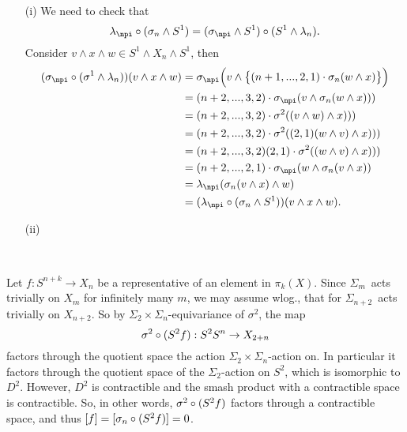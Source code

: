 \begin{exercise}[2]\ 
\begin{enumerate}
\item[(i)]
We need to check that 
\[ \lambda_\npi \circ (\sigma_n \wedge S^1) = (\sigma_\npi \wedge S^1) \circ
(S^1 \wedge \lambda_n). \]
Consider $v \wedge x \wedge w \in S^1 \wedge X_n \wedge S^1$, then
\begin{align*}
(\sigma_\npi \circ (\sigma^1 \wedge \lambda_n))(v \wedge x \wedge w) 
&= \sigma_\npi\Big(v \wedge \big\{ (n+1,...,2,1)\cdot\sigma_n(w \wedge x)\big\}\Big) \\
&= (n+2,...,3,2)\cdot\sigma_\npi(v \wedge \sigma_n(w\wedge x))) \\
&= (n+2,...,3,2) \cdot \sigma^2( (v \wedge w) \wedge x))) \\
&= (n+2,...,3,2) \cdot \sigma^2( (2,1) (w \wedge v) \wedge x))) \\
&= (n+2,...,3,2)(2,1) \cdot \sigma^2( (w \wedge v) \wedge x))) \\
&= (n+2,...,2,1) \cdot \sigma_\npi( w \wedge \sigma_n(v \wedge x)) \\
&= \lambda_\npi( \sigma_n(v \wedge x) \wedge w) \\
&= (\lambda_\npi \circ (\sigma_n \wedge S^1))(v \wedge x \wedge w).
\end{align*}

\item[(ii)]
\end{enumerate}
\end{exercise}

\begin{exercise}[3]\ 

Let $f : S^{n+k} \to X_n$ be a representative of an element in $\pi_k(X)$.
Since $\Sigma_m$ acts trivially on $X_m$ for infinitely many $m$, we may assume
wlog., that for $\Sigma_{n+2}$ acts trivially on $X_{n+2}$. 
So by $\Sigma_2 \times \Sigma_n$-equivariance of $\sigma^2$, the map
\[ \sigma^2 \circ (S^2 \smash f) : S^2 \smash S^n \to X_{2+n} \]
factors through the quotient space the action $\Sigma_2 \times
\Sigma_n$-action on. In particular it factors through the quotient space of the
$\Sigma_2$-action on $S^2$, which is isomorphic to $D^2$. However, $D^2$ is
contractible and the smash product with a contractible space is contractible.
So, in other words,
$\sigma^2 \circ (S^2 \smash f)$ factors through a contractible space, and thus 
$[f] = [\sigma_n \circ (S^2 \smash f)] = 0$.
\end{exercise}


